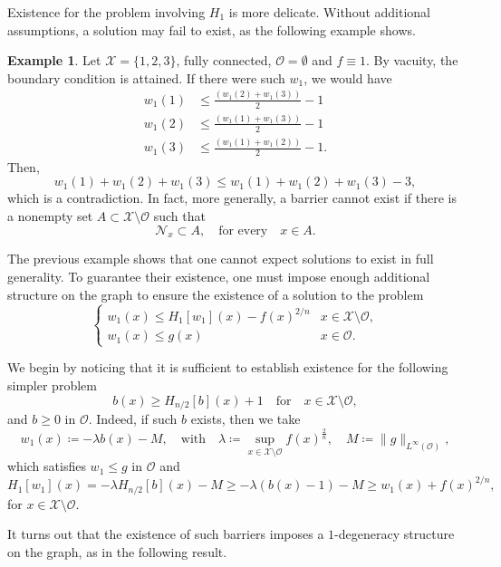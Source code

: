 \documentclass[reqno,11pt]{amsart}
\numberwithin{equation}{section}
\theoremstyle{definition}
\newtheorem{example}[theorem]{Example}
\theoremstyle{remark}
\begin{document}
Existence for the problem involving \(H_1\) is more delicate. Without additional assumptions, a solution may fail to exist, as the following example shows.

\begin{example}
Let $\mathcal{X} = \{1,2,3\}$, fully connected, $\mathcal{O} = \emptyset$ and $f \equiv 1$. By vacuity, the boundary condition is attained. If there were such $w_1$, we would have
\begin{align*}
    w_1(1) &\leq \frac{(w_1(2) + w_1(3))}{2} - 1\\
    w_1(2) &\leq \frac{(w_1(1) + w_1(3))}{2} - 1\\
    w_1(3) &\leq \frac{(w_1(1) + w_1(2))}{2} - 1.
\end{align*}
Then,
\[
    w_1(1) + w_1(2) + w_1(3) \leq w_1(1) + w_1(2) + w_1(3) - 3,
\]
which is a contradiction. In fact, more generally, a barrier cannot exist if there is a nonempty set $A \subset \mathcal{X} \setminus \mathcal{O}$ such that
\[
    \mathcal{N}_x \subset A, \quad \text{for every} \quad x \in A.
\]
\end{example}

The previous example shows that one cannot expect solutions to exist in full generality. To guarantee their existence, one must impose enough additional structure on the graph to ensure the existence of a solution to the problem
\[
\begin{cases}
    w_1 (x) \leq H_{1}[w_1](x)-f(x)^{2/n} &x \in \mathcal{X}\setminus\mathcal{O},\\
    w_1 (x) \leq g (x) & x\in  \mathcal{O}.
\end{cases}
\]

\medskip

We begin by noticing that it is sufficient to establish existence for the following simpler problem
\[
    b(x) \geq H_{n/2}[b](x)+1 \quad \text{for} \quad x \in \mathcal{X}\setminus \mathcal{O},
\]
and $b \geq 0$ in $\mathcal{O}$. Indeed, if such $b$ exists, then we take
\[
    w_1(x) \coloneqq -\lambda b(x) - M , \quad \text{with} \quad \lambda \coloneqq \sup_{x \in \mathcal{X} \setminus \mathcal{O}}f(x)^{\frac{2}{n}}, \quad M \coloneqq \|g\|_{L^\infty(\mathcal{O})},
\]
which satisfies $w_1 \leq g$ in $\mathcal{O}$ and
\[
    H_1[w_1](x) = -\lambda H_{n/2} [b](x) - M \geq -\lambda (b(x) - 1) - M \geq w_1(x) + f(x)^{2/n},
\]
for $x \in \mathcal{X} \setminus \mathcal{O}$.

It turns out that the existence of such barriers imposes a $1$-degeneracy structure on the graph, as in the following result.
\end{document}
